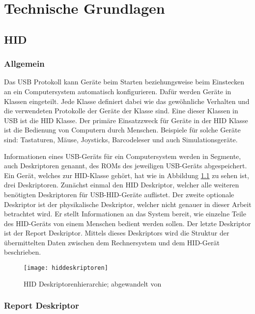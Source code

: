 
\chapter{Technische Grundlagen}

\section{\acf{HID}}

\subsection{Allgemein}
Das USB Protokoll kann Geräte beim Starten beziehungsweise beim Einstecken an ein Computersystem automatisch konfigurieren. Dafür werden Geräte in Klassen eingeteilt. Jede Klasse definiert dabei wie das gewöhnliche Verhalten und die verwendeten Protokolle der Geräte der Klasse sind. Eine dieser Klassen in USB ist die \ac{HID} Klasse. Der primäre Einsatzzweck für Geräte in der \acs{HID} Klasse ist die Bedienung von Computern durch Menschen. Beispiele für solche Geräte sind: Tastaturen, Mäuse, Joysticks, Barcodeleser und auch Simulationsgeräte. \cite[S.~1f.]{usbHIDS}

Informationen eines USB-Geräts für ein Computersystem werden in Segmente, auch Deskriptoren genannt, des ROMs des jeweiligen USB-Geräts abgespeichert. Ein Gerät, welches zur \acs{HID}-Klasse gehört, hat wie in Abbildung \ref{fig:hiddeskriptoren} zu sehen ist, drei Deskriptoren. Zunächst einmal den \acs{HID} Deskriptor, welcher alle weiteren benötigten Deskriptoren für USB-\acs{HID}-Geräte auflistet. Der zweite optionale Deskriptor ist der physikalische Deskriptor, welcher nicht genauer in dieser Arbeit betrachtet wird. Er stellt Informationen an das System bereit, wie einzelne Teile des \acs{HID}-Geräts von einem Menschen bedient werden sollen. Der letzte Deskriptor ist der Report Deskriptor. Mittels dieses Deskriptors wird die Struktur der übermittelten Daten zwischen dem Rechnersystem und dem \acs{HID}-Gerät beschrieben. \cite[S.~4f.]{usbHIDS}

\begin{figure}[h]
    \centering
    \texttt{[image: hiddeskriptoren]}
    \caption{\acs{HID} Deskriptorenhierarchie; abgewandelt von \cite[S.~4]{usbHIDS}}
    \label{fig:hiddeskriptoren}
\end{figure}

\subsection{Report Deskriptor}

